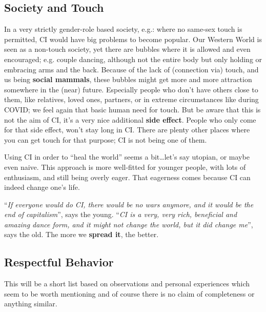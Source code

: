 \subsection{Society and Touch}\label{subsec:society-and-touch}

In a very strictly gender-role based society, e.g.: where no same-sex touch is permitted, CI would have big problems to become popular.
Our Western World is seen as a non-touch society, yet there are bubbles where it is allowed and even encouraged; e.g. couple dancing, although not the entire body but only holding or embracing arms and the back.
Because of the lack of (connection via) touch, and us being \textbf{social mammals}, these bubbles might get more and more attraction somewhere in the (near) future.
Especially people who don't have others close to them, like relatives, loved ones, partners, or in extreme circumstances like during COVID; we feel again that basic human need for touch.
But be aware that this is not the aim of CI, it's a very nice additional \textbf{side effect}.
People who only come for that side effect, won't stay long in CI\@.
There are plenty other places where you can get touch for that purpose; CI is not being one of them.

Using CI in order to ``heal the world'' seems a bit\ldots let's say utopian, or maybe even naive.
This approach is more well-fitted for younger people, with lots of enthusiasm, and still being overly eager.
That eagerness comes because CI can indeed change one's life.

``\textit{If everyone would do CI, there would be no wars anymore, and it would be the end of capitalism}'', says the young.
``\textit{CI is a very, very rich, beneficial and amazing dance form, and it might not change the world, but it did change me}'', says the old.
The more we \textbf{spread it}, the better.

\subsection{Respectful Behavior}\label{subsec:respectful-behavior}

This will be a short list based on observations and personal experiences which seem to be worth mentioning and of course there is no claim of completeness or anything similar.

